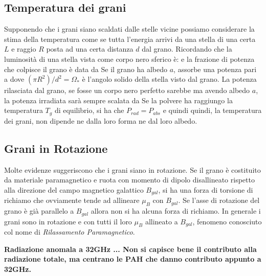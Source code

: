 \subsection{Temperatura dei grani}
Supponendo che i grani siano scaldati dalle stelle vicine possiamo considerare la stima della temperatura come se tutta l'energia arrivi da una stella di una certa $L$ e raggio $R$ posta ad una certa distanza $d$ dal grano. Ricordando che la luminosit\`a di una stella vista come corpo nero sferico \`e:
e la frazione di potenza che colpisce il grano \`e data da
Se il grano ha albedo $a$, assorbe una potenza pari a 
dove $(\pi R^2)/d^2 = \Omega_{*}$ \`e l'angolo solido della stella visto dal grano.
La potenza rilasciata dal grano, se fosse un corpo nero perfetto sarebbe
ma avendo albedo $a$, la potenza irradiata sar\`a sempre scalata da
Se la polvere ha raggiungo la temperatura $T_g$ di equilibrio, si ha che $P_{rad} = P_{abs}$ e quindi
quindi, la temperatura dei grani, non dipende ne dalla loro forma ne dal loro albedo.

\subsection{Grani in Rotazione}
Molte evidenze suggeriscono che i grani siano in rotazione. Se il grano \`e costituito da materiale paramagnetico e ruota con momento di dipolo disallineato rispetto alla direzione del campo magnetico galattico $B_{gal}$, si ha una forza di torsione di richiamo che ovviamente tende ad allineare $\mu_{B}$ con $B_{gal}$. Se l'asse di rotazione del grano \`e gi\`a parallelo a $B_{gal}$ allora non si ha alcuna forza di richiamo. In generale i grani sono in rotazione e con tutti il loro $\mu_{B}$ allineato a $B_{gal}$, fenomeno conosciuto col nome di \emph{Rilassamento Paramagnetico}.

\textbf{Radiazione anomala a 32GHz ... Non si capisce bene il contributo alla radiazione totale, ma centrano le PAH che danno contributo appunto a 32GHz.}


